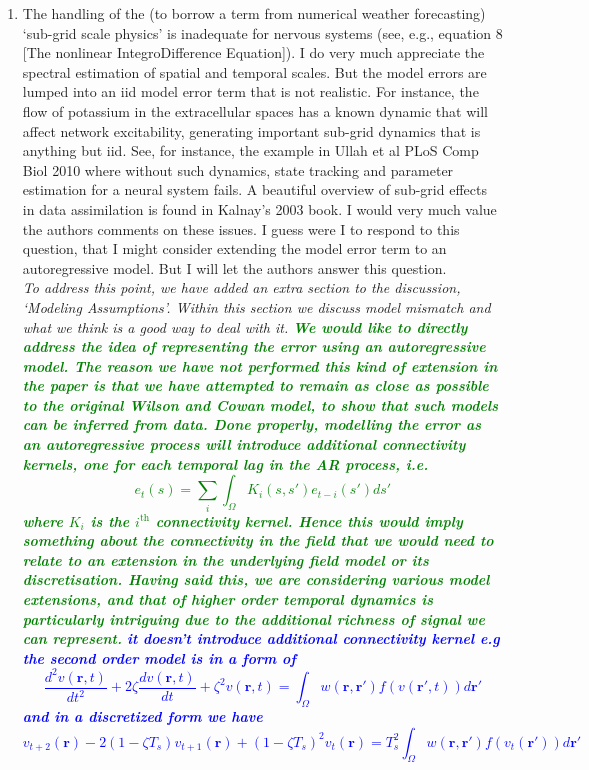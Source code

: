\documentclass{article}
\newcommand{\mike}[1]{\textsf{\emph{\textbf{\textcolor{green}{#1}}}}}
\newcommand{\parham}[1]{\textsf{\emph{\textbf{\textcolor{blue}{#1}}}}}
\begin{document}
\begin{enumerate}
    \item The handling of the (to borrow a term from numerical weather forecasting) `sub-grid scale physics' is inadequate for nervous systems (see, e.g., equation 8 [The nonlinear IntegroDifference Equation]). I do very much appreciate the spectral estimation of spatial and temporal scales. But the model errors are lumped into an iid model error term that is not realistic. For instance, the flow of potassium in the extracellular spaces has a known dynamic that will affect network excitability, generating important sub-grid dynamics that is anything but iid. See, for instance, the example in Ullah et al PLoS Comp Biol 2010 where without such dynamics, state tracking and parameter estimation for a neural system fails. A beautiful overview of sub-grid effects in data assimilation is found in Kalnay's 2003 book. I would very much value the authors comments on these issues. I guess were I to respond to this question, that I might consider extending the model error term to an autoregressive model. But I will let the authors answer this question.\\

	\emph{To address this point, we have added an extra section to the discussion, `Modeling Assumptions'. Within this section we discuss model mismatch and what we think is a good way to deal with it.}
	\emph{\mike{We would like to directly address the idea of representing the error using an autoregressive model. The reason we have not performed this kind of extension in the paper is that we have attempted to remain as close as possible to the original Wilson and Cowan model, to show that such models can be inferred from data. Done properly, modelling the error as an autoregressive process  will introduce additional connectivity kernels, one for each temporal lag in the AR process, i.e.
	\begin{equation}
	   e_t(s) = \sum_i \int_\Omega K_i(s,s')e_{t-i}(s')ds'
	\end{equation} 
where $K_i$ is the $i^\mathrm{th}$ connectivity kernel. Hence this would imply something about the connectivity in the field that we would need to relate to an extension in the underlying field model or its discretisation. Having said this, we are considering various model extensions, and that of higher order temporal dynamics is particularly intriguing due to the additional richness of signal we can represent.}
	\parham{it doesn't introduce additional connectivity kernel e.g the second order model is in a form of \begin{equation}
 \frac{d^2v(\mathbf r,t)}{dt^2}+2\zeta \frac{dv(\mathbf
r,t)}{dt}+\zeta^2v(\mathbf r,t)=\int_\Omega  {w\left( \mathbf{r},\mathbf{r}' \right)f\left( v\left(
\mathbf{r}',t \right) \right)d\mathbf{r}'} 
\end{equation}
and in a discretized form we have
\begin{equation}
 v_{t+2}(\mathbf r)-2(1-\zeta T_s)v_{t+1}(\mathbf r)+(1-\zeta T_s)^2v_t(\mathbf r)= T_s^2\int_\Omega  {w\left( \mathbf{r},\mathbf{r}' \right)f\left( v_t\left(
\mathbf{r}'\right) \right)d\mathbf{r}'} 
\end{equation}}}


\end{enumerate}
\end{document}
